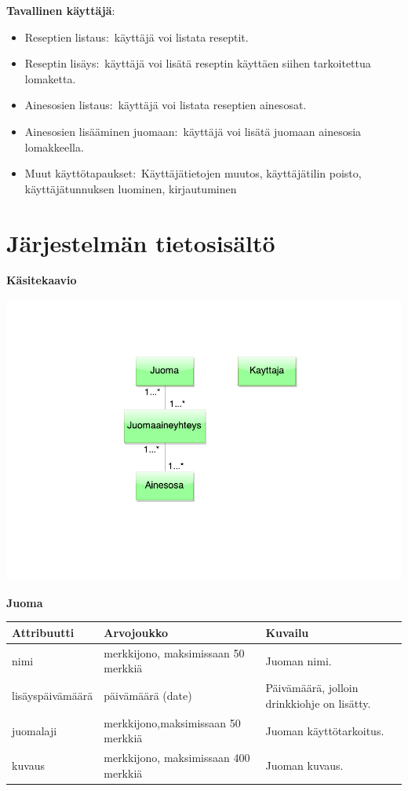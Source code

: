 \documentclass[a4paper]{article}
\begin{document}
\begin{flushleft}\textbf{Tavallinen käyttäjä\(\colon\)} \end{flushleft}

\begin{itemize}
		\item Reseptien listaus\(\colon\) käyttäjä voi listata reseptit.
	\item Reseptin lisäys\(\colon\) käyttäjä voi lisätä reseptin käyttäen siihen tarkoitettua lomaketta. 
	\item Ainesosien listaus\(\colon\) käyttäjä voi listata reseptien ainesosat.
	\item Ainesosien lisääminen juomaan\(\colon\) käyttäjä voi lisätä juomaan ainesosia lomakkeella.
	\item Muut käyttötapaukset\(\colon\) Käyttäjätietojen muutos, käyttäjätilin poisto, käyttäjätunnuksen luominen, kirjautuminen
\end{itemize}

\newpage
\section{Järjestelmän tietosisältö}
\begin{flushleft}\textbf{Käsitekaavio} \end{flushleft}

\includegraphics[scale=0.8]{kasitekaavio.pdf}

\begin{flushleft}\textbf{Juoma} \end{flushleft}
\begin{flushleft}
	\begin{tabular}{|l|l|l|}\hline
			Attribuutti      & Arvojoukko        & Kuvailu\\
			\hline
			nimi & merkkijono, maksimissaan 50 merkkiä & Juoman nimi.\\ 
			\hline		
			lisäyspäivämäärä & päivämäärä (date) & Päivämäärä, jolloin drinkkiohje on lisätty.\\ 
			\hline			
			juomalaji    & merkkijono,maksimissaan 50 merkkiä  & Juoman käyttötarkoitus. \\ 
			\hline
			kuvaus    & merkkijono, maksimissaan 400 merkkiä & Juoman kuvaus. \\ 
				\hline
	\end{tabular}
\end{flushleft}
\end{document}
